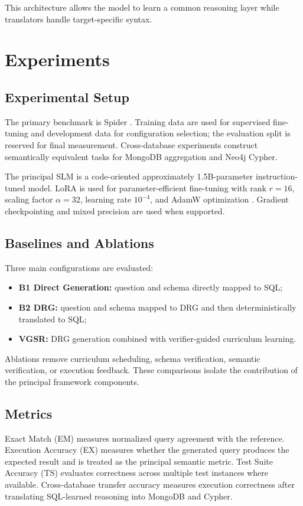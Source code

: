 \documentclass[conference]{IEEEtran}
\begin{document}
This architecture allows the model to learn a common reasoning layer while translators handle target-specific syntax.

\section{Experiments}
\subsection{Experimental Setup}
The primary benchmark is Spider \cite{b2}. Training data are used for supervised fine-tuning and development data for configuration selection; the evaluation split is reserved for final measurement. Cross-database experiments construct semantically equivalent tasks for MongoDB aggregation and Neo4j Cypher.

The principal SLM is a code-oriented approximately 1.5B-parameter instruction-tuned model. LoRA is used for parameter-efficient fine-tuning with rank $r=16$, scaling factor $\alpha=32$, learning rate $10^{-4}$, and AdamW optimization \cite{c34}. Gradient checkpointing and mixed precision are used when supported.

\subsection{Baselines and Ablations}
Three main configurations are evaluated:
\begin{itemize}
\item \textbf{B1 Direct Generation:} question and schema directly mapped to SQL;
\item \textbf{B2 DRG:} question and schema mapped to DRG and then deterministically translated to SQL;
\item \textbf{VGSR:} DRG generation combined with verifier-guided curriculum learning.
\end{itemize}

Ablations remove curriculum scheduling, schema verification, semantic verification, or execution feedback. These comparisons isolate the contribution of the principal framework components.

\subsection{Metrics}
Exact Match (EM) measures normalized query agreement with the reference. Execution Accuracy (EX) measures whether the generated query produces the expected result and is treated as the principal semantic metric. Test Suite Accuracy (TS) evaluates correctness across multiple test instances where available. Cross-database transfer accuracy measures execution correctness after translating SQL-learned reasoning into MongoDB and Cypher.
\end{document}
